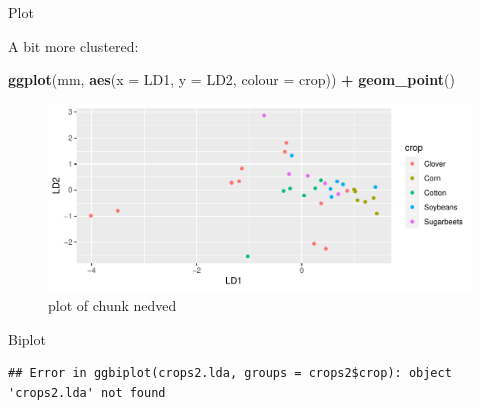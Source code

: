 \documentclass[ignorenonframetext,]{beamer}
\newenvironment{Shaded}{\begin{snugshade}}{\end{snugshade}}
\newcommand{\DataTypeTok}[1]{\textcolor[rgb]{0.13,0.29,0.53}{#1}}
\newcommand{\KeywordTok}[1]{\textcolor[rgb]{0.13,0.29,0.53}{\textbf{#1}}}
\newcommand{\NormalTok}[1]{#1}
\newcommand{\OperatorTok}[1]{\textcolor[rgb]{0.81,0.36,0.00}{\textbf{#1}}}
\newcommand{\StringTok}[1]{\textcolor[rgb]{0.31,0.60,0.02}{#1}}
\begin{document}
\begin{frame}[fragile]{Plot}
\protect\hypertarget{plot}{}

A bit more clustered:

\begin{Shaded}
\begin{Highlighting}[]
\KeywordTok{ggplot}\NormalTok{(mm, }\KeywordTok{aes}\NormalTok{(}\DataTypeTok{x =}\NormalTok{ LD1, }\DataTypeTok{y =}\NormalTok{ LD2, }\DataTypeTok{colour =}\NormalTok{ crop)) }\OperatorTok{+}
\StringTok{  }\KeywordTok{geom_point}\NormalTok{()}
\end{Highlighting}
\end{Shaded}

\begin{figure}
\centering
\includegraphics{figure/nedved-1.pdf}
\caption{plot of chunk nedved}
\end{figure}

\end{frame}

\begin{frame}[fragile]{Biplot}
\protect\hypertarget{biplot-2}{}

\begin{Shaded}
\end{Shaded}

\begin{verbatim}
## Error in ggbiplot(crops2.lda, groups = crops2$crop): object 'crops2.lda' not found
\end{verbatim}

\end{frame}
\end{document}
